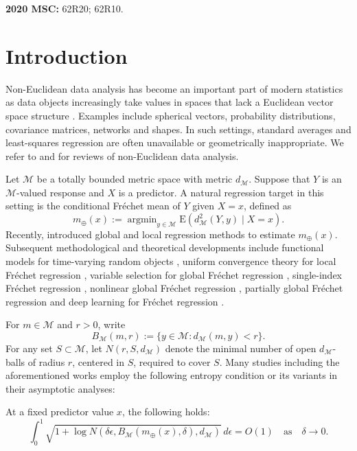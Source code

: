 \documentclass[11pt]{article}
\numberwithin{equation}{section}
\newenvironment{customcon}[1]
{\renewcommand\thecondition{#1}\condition}
{\endcondition}
\newcommand{\M}{\mathcal{M}}
\newcommand{\E}{\mathrm{E}}
\newcommand{\dd}{\,d}
\DeclareMathOperator*{\argmin}{\arg\min}
\begin{document}
\medskip
\noindent\textbf{2020 MSC:}
62R20; 62R10.

\section{Introduction}

Non-Euclidean data analysis has become an important part of modern statistics as data objects increasingly take values in spaces that lack a Euclidean vector space structure \citep{Chang1986,Hein2009,DiMarzioPanzeraTaylor2014,JeonParkVanKeilegom2021,stocker2023,JeonVanBever2025,JeonVanBever2026}. Examples include spherical vectors, probability distributions, covariance matrices, networks and shapes. In such settings, standard averages and least-squares regression are often unavailable or geometrically inappropriate. We refer to \citet{MarronAlonso2014} and \citet{dubey2024} for reviews of non-Euclidean data analysis.

Let \(\M\) be a totally bounded metric space with metric \(d_\M\). Suppose that \(Y\) is an \(\M\)-valued response and \(X\) is a predictor. A natural regression target in this setting is the conditional Fr\'echet mean of \(Y\) given \(X=x\), defined as
\[
  m_\oplus(x):=\argmin_{y\in\M}\E(d_\M^2(Y,y)\mid X=x).
\]
Recently, \citet{PetersenMuller2019} introduced global and local regression methods to estimate $m_\oplus(x)$. Subsequent methodological and theoretical developments include functional models for time-varying random objects \citep{DubeyMuller2020}, uniform convergence theory for local Fr\'echet regression \citep{ChenMuller2022}, variable selection for global Fr\'echet regression \citep{TuckerWuMuller2023}, single-index Fr\'echet regression \citep{BhattacharjeeMuller2023}, nonlinear global Fr\'echet regression \citep{Bhattacharjee2025}, partially global Fr\'echet regression \citep{TuckerWu2025} and deep learning for Fr\'echet regression \citep{iao2025}.

For \(m\in\M\) and \(r>0\), write
\[
B_\M(m,r):=\{y\in\M:d_\M(m,y)<r\}.
\]
For any set \(S\subset\M\), let \(N(r,S,d_\M)\) denote the minimal number of open \(d_\M\)-balls of radius \(r\), centered in \(S\), required to cover \(S\). Many studies including the aforementioned works employ the following entropy condition or its variants in their asymptotic analyses:

\begin{customcon}{A}\label{con:A}
At a fixed predictor value \(x\), the following holds:
\begin{equation*}
    \int_0^1 \sqrt{1+\log N(\delta \epsilon,B_\M(m_\oplus(x),\delta),d_\M)}\dd \epsilon=O(1)\quad\text{as}\quad\delta\to0.
\end{equation*}
\end{customcon}
\end{document}
